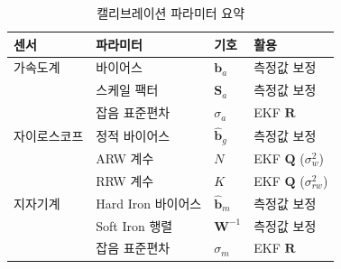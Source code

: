                 \begin{table}[htbp!]
                    \centering
                    \caption{캘리브레이션 파라미터 요약}
                    \label{tab:calib_params}
                    \begin{tabular}{llll}
                        \toprule
                        센서 & 파라미터 & 기호 & 활용 \\
                        \midrule
                        가속도계 & 바이어스 & $\mathbf{b}_a$ & 측정값 보정 \\
                                & 스케일 팩터 & $\mathbf{S}_a$ & 측정값 보정 \\
                                & 잡음 표준편차 & $\sigma_a$ & EKF $\mathbf{R}$ \\
                        \midrule
                        자이로스코프 & 정적 바이어스 & $\hat{\mathbf{b}}_g$ & 측정값 보정 \\
                                    & ARW 계수 & $N$ & EKF $\mathbf{Q}$ ($\sigma_w^2$) \\
                                    & RRW 계수 & $K$ & EKF $\mathbf{Q}$ ($\sigma_{rw}^2$) \\
                        \midrule
                        지자기계 & Hard Iron 바이어스 & $\hat{\mathbf{b}}_m$ & 측정값 보정 \\
                                & Soft Iron 행렬 & $\mathbf{W}^{-1}$ & 측정값 보정 \\
                                & 잡음 표준편차 & $\sigma_m$ & EKF $\mathbf{R}$ \\
                        \bottomrule
                    \end{tabular}
                \end{table}